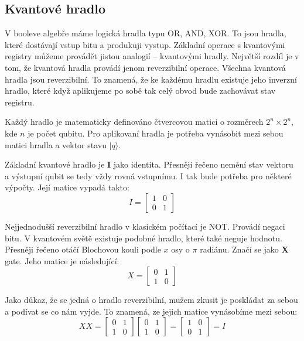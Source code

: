 \documentclass[11pt]{article}
\begin{document}
\subsection{Kvantové hradlo}
V booleve algebře máme logická hradla typu OR, AND, XOR.
To jsou hradla, které dostávají vstup bitu a produkuji vystup.
Základní operace s kvantovými registry můžeme provádět jistou analogií – kvantovými hradly.
Největší rozdíl je v tom, že kvantová hradla provádí jenom reverzibilní operace.
Všechna kvantová hradla jsou reverzibilní.
To znamená, že ke každému hradlu existuje jeho inverzní hradlo, které když aplikujeme po sobě tak celý obvod bude zachovávat stav registru.
\par Každý hradlo je matematicky definováno čtvercovou matici o rozměrech $2^n \times 2^n$, kde $n$ je počet qubitu.
Pro aplikovaní hradla je potřeba vynásobit mezi sebou matici hradla a vektor stavu $|q\rangle$.
\par Základní kvantové hradlo je \textbf{I} jako identita.
Přesněji řečeno nemění stav vektoru a výstupní qubit se tedy vždy rovná vstupnímu. I tak bude potřeba pro některé výpočty.
Její matice vypadá takto:
$$I = \begin{bmatrix}
        1 & 0 \\
        0 & 1
    \end{bmatrix}$$
\par Nejjednodušší reverzibilní hradlo v klasickém počítací je NOT.
Provádí negaci bitu. V kvantovém světě existuje podobné hradlo, které také neguje hodnotu.
Přesněji řečeno otáčí Blochovou kouli podle $x$ osy o $\pi$ radiánu. Značí se jako \textbf{X} gate.
Jeho matice je následující:
$$X = \begin{bmatrix}
        0 & 1 \\
        1 & 0
    \end{bmatrix}$$
\par Jako důkaz, že se jedná o hradlo reverzibilní, mužem zkusit je poskládat za sebou a podívat se co nám vyjde.
To znamená, ze jejich matice vynásobíme mezi sebou:
$$XX = \begin{bmatrix}
        0 & 1 \\
        1 & 0
    \end{bmatrix}\begin{bmatrix}
        0 & 1 \\
        1 & 0
    \end{bmatrix} = \begin{bmatrix}
        1 & 0 \\
        0 & 1
    \end{bmatrix} = I$$
\end{document}
